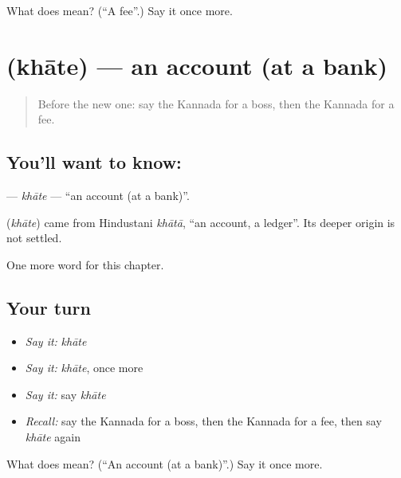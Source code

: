 \begin{tcolorbox}[breakable,colback=teal!4,colframe=teal!35!black,title={Before you move on}]
What does  mean? (\textquotedblleft{}A fee\textquotedblright{}.) Say it once more.
\end{tcolorbox}
\section[\texorpdfstring{\kn{ಖಾತೆ} (khāte)}{ಖಾತೆ (khāte)}]{ (khāte) — an account (at a bank)}

\label{lesson:KA-C195-khate}



\begin{quote}
Before the new one: say the Kannada for a boss, then the Kannada for a fee.
\end{quote}

\subsection*{You'll want to know: }
\textbf{} — \emph{khāte} — \textquotedblleft{}an account (at a bank)\textquotedblright{}.

\begin{cousinweb}
\textbf{} (\emph{khāte}) came from Hindustani \emph{khātā}, \textquotedblleft{}an account, a ledger\textquotedblright{}. Its deeper origin is not settled.
\end{cousinweb}

\begin{grammarlens}[title={What you've built}]
One more word for this chapter.
\end{grammarlens}

\subsection*{Your turn}
\begin{itemize}
\raggedright
  \item \emph{Say it:} \emph{khāte}
  \item \emph{Say it:} \emph{khāte}, once more
  \item \emph{Say it:} say \emph{khāte}
  \item \emph{Recall:} say the Kannada for a boss, then the Kannada for a fee, then say \emph{khāte} again
\end{itemize}

\begin{tcolorbox}[breakable,colback=teal!4,colframe=teal!35!black,title={Before you move on}]
What does  mean? (\textquotedblleft{}An account (at a bank)\textquotedblright{}.) Say it once more.
\end{tcolorbox}
